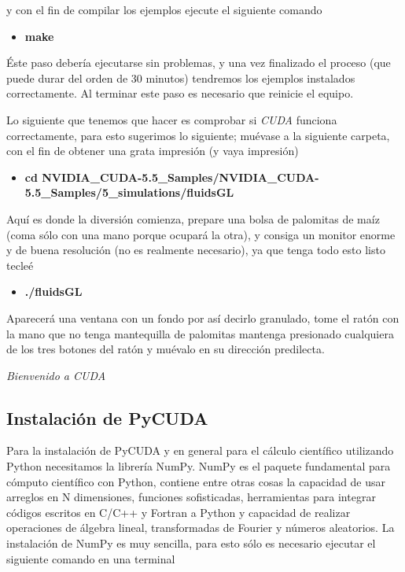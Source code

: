 \documentclass{article}
\begin{document}
y con el fin de compilar los ejemplos ejecute el siguiente comando

\begin{itemize}
\itemsep1pt\parskip0pt
\item
  \textbf{make}
\end{itemize}

Éste paso debería ejecutarse sin problemas, y una vez finalizado el
proceso (que puede durar del orden de 30 minutos) tendremos los ejemplos
instalados correctamente. Al terminar este paso es necesario que
reinicie el equipo.

Lo siguiente que tenemos que hacer es comprobar si \emph{CUDA} funciona
correctamente, para esto sugerimos lo siguiente; muévase a la siguiente
carpeta, con el fin de obtener una grata impresión (y vaya impresión)

\begin{itemize}
\itemsep1pt\parskip0pt
\item
  \textbf{cd
  NVIDIA\_CUDA-5.5\_Samples/NVIDIA\_CUDA-5.5\_Samples/5\_simulations/fluidsGL}
\end{itemize}

Aquí es donde la diversión comienza, prepare una bolsa de palomitas de
maíz (coma sólo con una mano porque ocupará la otra), y consiga un
monitor enorme y de buena resolución (no es realmente necesario), ya que
tenga todo esto listo tecleé

\begin{itemize}
\itemsep1pt\parskip0pt
\item
  \textbf{./fluidsGL}
\end{itemize}

Aparecerá una ventana con un fondo por así decirlo granulado, tome el
ratón con la mano que no tenga mantequilla de palomitas mantenga
presionado cualquiera de los tres botones del ratón y muévalo en su
dirección predilecta.

\emph{Bienvenido a CUDA}


    \subsection{Instalación de PyCUDA}


    Para la instalación de PyCUDA y en general para el cálculo científico
utilizando Python necesitamos la librería NumPy. NumPy es el paquete
fundamental para cómputo científico con Python, contiene entre otras
cosas la capacidad de usar arreglos en N dimensiones, funciones
sofisticadas, herramientas para integrar códigos escritos en C/C++ y
Fortran a Python y capacidad de realizar operaciones de álgebra lineal,
transformadas de Fourier y números aleatorios. La instalación de NumPy
es muy sencilla, para esto sólo es necesario ejecutar el siguiente
comando en una terminal
\end{document}
